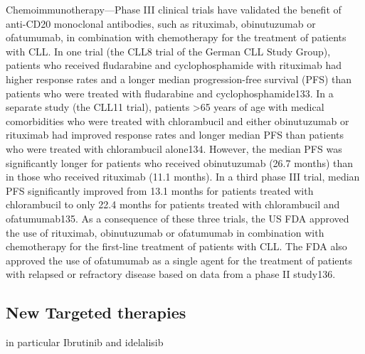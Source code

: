 \documentclass[11pt, a4paper, twosided]{book}
\begin{document}
Chemoimmunotherapy---Phase III clinical trials have validated the benefit of anti-CD20 monoclonal antibodies, such as rituximab, obinutuzumab or ofatumumab, in combination with chemotherapy for the treatment of patients with CLL. In one trial (the CLL8 trial of the German CLL Study Group), patients who received fludarabine and cyclophosphamide with rituximab had higher response rates and a longer median progression-free survival (PFS) than patients who were treated with fludarabine and cyclophosphamide133. In a separate study (the CLL11 trial), patients \textgreater65 years of age with medical comorbidities who were treated with chlorambucil and either obinutuzumab or rituximab had improved response rates and longer median PFS than patients who were treated with chlorambucil alone134. However, the median PFS was significantly longer for patients who received obinutuzumab (26.7 months) than in those who received rituximab (11.1 months). In a third phase III trial, median PFS significantly improved from 13.1 months for patients treated with chlorambucil to only 22.4 months for patients treated with chlorambucil and ofatumumab135. As a consequence of these three trials, the US FDA approved the use of rituximab, obinutuzumab or ofatumumab in combination with chemotherapy for the first-line treatment of patients with CLL. The FDA also approved the use of ofatumumab as a single agent for the treatment of patients with relapsed or refractory disease based on data from a phase II study136.

\hypertarget{new-targeted-therapies}{%
\subsection{New Targeted therapies}\label{new-targeted-therapies}}

in particular Ibrutinib and idelalisib
\end{document}
